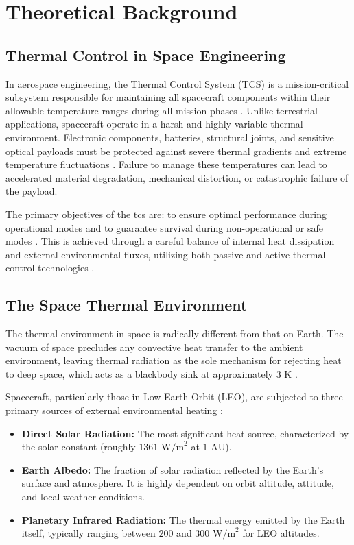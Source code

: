 \chapter{Theoretical Background}
\label{ch:theoretical_background}

\section{Thermal Control in Space Engineering}
In aerospace engineering, the Thermal Control System (TCS) is a mission-critical subsystem responsible 
for maintaining all spacecraft components within their allowable temperature ranges during all mission phases \cite{tcs_slides0, tfg_carol}. 
Unlike terrestrial applications, spacecraft operate in a harsh and highly variable thermal environment. 
Electronic components, batteries, structural joints, and sensitive optical payloads must be protected 
against severe thermal gradients and extreme temperature fluctuations \cite{spacethctrl, tfg_carol}. Failure 
to manage these temperatures can lead to accelerated material degradation, mechanical distortion, or 
catastrophic failure of the payload. %

The primary objectives of the \acrshort{tcs} are: to ensure optimal performance during operational modes
and to guarantee survival during non-operational or safe modes \cite{tcs_slides0}. This is achieved through
a careful balance of internal heat dissipation and external environmental fluxes, utilizing 
both passive and active thermal control technologies \cite{tcs_slides0,th_handbook}.

\section{The Space Thermal Environment}
The thermal environment in space is radically different from that on Earth. The vacuum 
of space precludes any convective heat transfer to the ambient environment, leaving thermal radiation 
as the sole mechanism for rejecting heat to deep space, which acts as a blackbody sink at 
approximately $3\text{ K}$ \cite{tfg_carol,tcs_slides0}.

Spacecraft, particularly those in Low Earth Orbit (LEO), are subjected to
 three primary sources of external environmental heating \cite{tfg_carol}:
\begin{itemize}
    \item \textbf{Direct Solar Radiation:} The most significant heat source, characterized by the solar constant (roughly $1361 \text{ W/m}^2$ at $1\text{ AU}$).
    \item \textbf{Earth Albedo:} The fraction of solar radiation reflected by the Earth's surface and atmosphere. It is highly dependent on orbit altitude, attitude, and local weather conditions.
    \item \textbf{Planetary Infrared Radiation:} The thermal energy emitted by the Earth itself, typically ranging between $200$ and $300 \text{ W/m}^2$ for LEO altitudes.
\end{itemize}


